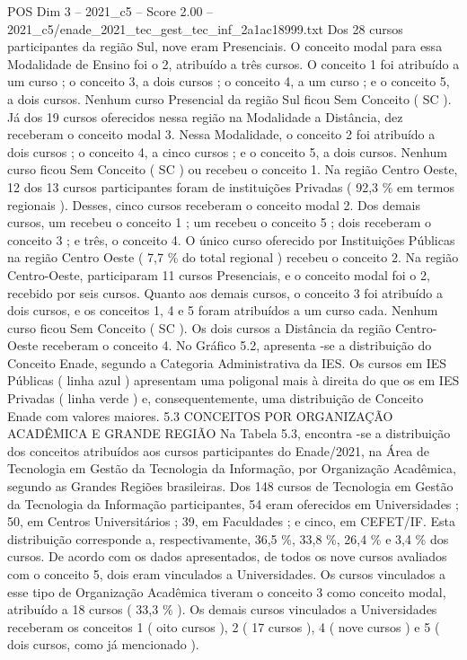 \begin{textsample}{POS Dim 3 – 2021\_c5 – Score 2.00 – 2021\_c5/enade\_2021\_tec\_gest\_tec\_inf\_2a1ac18999.txt}
Dos 28 cursos participantes da região Sul, nove eram Presenciais.
O conceito modal para essa Modalidade de Ensino foi o 2, atribuído a três cursos.
O conceito 1 foi atribuído a um curso ; o conceito 3, a dois cursos ; o conceito 4, a um curso ; e o conceito 5, a dois cursos.
Nenhum curso Presencial da região Sul ficou Sem Conceito ( SC ).
Já dos 19 cursos oferecidos nessa região na Modalidade a Distância, dez receberam o conceito modal 3.
Nessa Modalidade, o conceito 2 foi atribuído a dois cursos ; o conceito 4, a cinco cursos ; e o conceito 5, a dois cursos.
Nenhum curso ficou Sem Conceito ( SC ) ou recebeu o conceito 1.
Na região Centro Oeste, 12 dos 13 cursos participantes foram de instituições Privadas ( 92,3 \% em termos regionais ).
Desses, cinco cursos receberam o conceito modal 2.
Dos demais cursos, um recebeu o conceito 1 ; um recebeu o conceito 5 ; dois receberam o conceito 3 ; e três, o conceito 4.
O único curso oferecido por Instituições Públicas na região Centro Oeste ( 7,7 \% do total regional ) recebeu o conceito 2.
Na região Centro-Oeste, participaram 11 cursos Presenciais, e o conceito modal foi o 2, recebido por seis cursos.
Quanto aos demais cursos, o conceito 3 foi atribuído a dois cursos, e os conceitos 1, 4 e 5 foram atribuídos a um curso cada.
Nenhum curso ficou Sem Conceito ( SC ).
Os dois cursos a Distância da região Centro-Oeste receberam o conceito 4.
No Gráfico 5.2, apresenta -se a distribuição do Conceito Enade, segundo a Categoria Administrativa da IES.
Os cursos em IES Públicas ( linha azul ) apresentam uma poligonal mais à direita do que os em IES Privadas ( linha verde ) e, consequentemente, uma distribuição de Conceito Enade com valores maiores. 5.3 CONCEITOS POR ORGANIZAÇÃO ACADÊMICA E GRANDE REGIÃO Na Tabela 5.3, encontra -se a distribuição dos conceitos atribuídos aos cursos participantes do Enade/2021, na Área de Tecnologia em Gestão da Tecnologia da Informação, por Organização Acadêmica, segundo as Grandes Regiões brasileiras.
Dos 148 cursos de Tecnologia em Gestão da Tecnologia da Informação participantes, 54 eram oferecidos em Universidades ; 50, em Centros Universitários ; 39, em Faculdades ; e cinco, em CEFET/IF.
Esta distribuição corresponde a, respectivamente, 36,5 \%, 33,8 \%, 26,4 \% e 3,4 \% dos cursos.
De acordo com os dados apresentados, de todos os nove cursos avaliados com o conceito 5, dois eram vinculados a Universidades.
Os cursos vinculados a esse tipo de Organização Acadêmica tiveram o conceito 3 como conceito modal, atribuído a 18 cursos ( 33,3 \% ).
Os demais cursos vinculados a Universidades receberam os conceitos 1 ( oito cursos ), 2 ( 17 cursos ), 4 ( nove cursos ) e 5 ( dois cursos, como já mencionado ).

\end{textsample}
